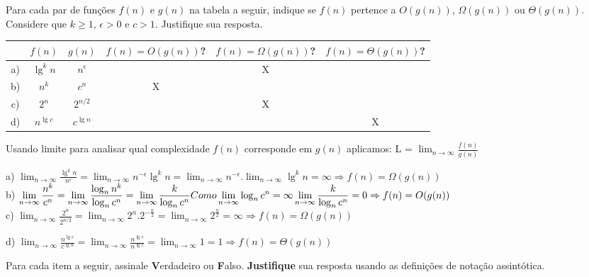 \documentclass[a4paper]{exam}
\begin{document}
\begin{questions}
  \question Para cada par de funções $f(n)$ e $g(n)$ na tabela a
  seguir, indique se $f(n)$ pertence a $O(g(n))$, $\Omega(g(n))$
  ou $\Theta(g(n))$. Considere que $k \geq 1$, $\epsilon > 0$ e
  $c > 1$. Justifique sua resposta.
  \begin{center}
    \begin{tabular}{|c|c|c|c|c|c|}
      \hline
      & $f(n)$ & $g(n)$ & $f(n) = O(g(n))$? & $f(n) = \Omega(g(n))$? & $f(n) = \Theta(g(n))$? \\
      \hline
      a) & $\lg^k n$  &  $n^{\epsilon}$   & & X & \\ \hline
      b) & $n^k$      &  $c^n$          & X & & \\ \hline
      c) & $2^n$      &  $2^{n/2}$       & & X & \\ \hline
      d) & $n^{\lg c}$ &  $c^{\lg n}$      & & & X \\ \hline
    \end{tabular}
  \end{center}
  \begin{solution}
    Usando limite para analisar qual complexidade $f(n)$ corresponde em $g(n)$ aplicamos: 
    L =  $\displaystyle\lim_{n\to\infty} \frac{f(n)}{g(n)}$

    a) $\displaystyle\lim_{n\to\infty} \frac{\lg^k n}{n^{\epsilon}} = \displaystyle\lim_{n\to\infty} n^{-\epsilon}\lg^k n
      = \displaystyle\lim_{n\to\infty} n^{-\epsilon} . \displaystyle\lim_{n\to\infty} \lg^k n 
      = \infty \Rightarrow f(n) = \Omega(g(n))$ \\

    b) $\displaystyle\lim_{n\to\infty} \frac{n^k}{c^n} = \displaystyle\lim_{n\to\infty} \frac{\log_n n^k}{\log_n c^n}
      = \displaystyle\lim_{n\to\infty} \frac{k}{\log_n c^n} \\ \\
      Como \displaystyle\lim_{n\to\infty} \log_n c^n = \infty \\
       \\\displaystyle\lim_{n\to\infty} \frac{k}{\log_n c^n} = 0 \Rightarrow f(n) = O(g(n))$ \\

    c) $\displaystyle\lim_{n\to\infty} \frac{2^n}{2^{n/2}} = \displaystyle\lim_{n\to\infty} 2^n.{2^{-\frac{n}{2}}}
      = \displaystyle\lim_{n\to\infty} 2^{\frac{n}{2}} = \infty \Rightarrow f(n) = \Omega(g(n))$

    d) $\displaystyle\lim_{n\to\infty} \frac{n^{\lg c}}{c^{\lg n}} = \displaystyle\lim_{n\to\infty} \frac{n^{\lg c}}{n^{\lg c}}
      = \displaystyle\lim_{n\to\infty} 1 = 1 \Rightarrow f(n) = \Theta(g(n))$
  \end{solution}
  \question Para cada item a seguir, assinale \textbf{V}erdadeiro 
  ou \textbf{F}also. \textbf{Justifique} sua resposta usando as 
  definições de notação assintótica.
  \begin{parts}

\end{parts}
\end{questions}
\end{document}

